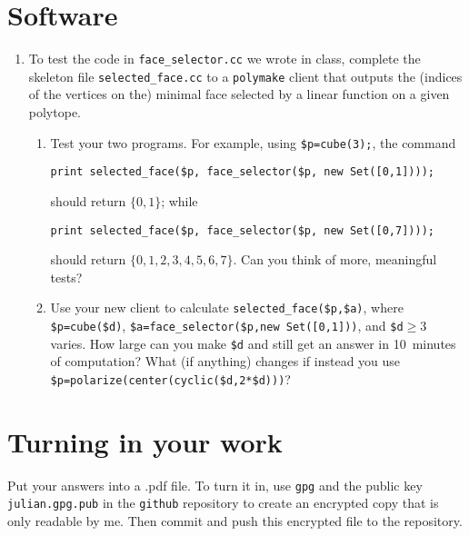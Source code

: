 \documentclass[11pt]{amsart}
\begin{document}
 \bigskip
 \section*{Software}

 \begin{enumerate}
   \setlength{\itemsep}{2ex}
 \item To test the code in \texttt{face\_selector.cc} we wrote in class, complete the skeleton file \texttt{selected\_face.cc} to a \texttt{polymake} client that outputs the (indices of the vertices on the) minimal face selected by a linear function on a given polytope. 
\begin{enumerate}
\item Test your two programs. For example, using \verb|$p=cube(3);|,
  the command 
\begin{verbatim}
print selected_face($p, face_selector($p, new Set([0,1])));
\end{verbatim}
should return $\{0,1\}$; while 
\begin{verbatim}
print selected_face($p, face_selector($p, new Set([0,7])));
\end{verbatim}
should return  $\{0,1,2,3,4,5,6,7\}$. Can you think of more, meaningful tests?

\item Use your new client to calculate \verb|selected_face($p,$a)|, where \verb|$p=cube($d)|, \verb|$a=face_selector($p,new Set([0,1]))|, and \verb|$d|${}\ge3$ varies. How large can you make \verb|$d| and still get an answer in 10~minutes of computation? What (if anything) changes if instead you use \verb|$p=polarize(center(cyclic($d,2*$d)))|? 
\end{enumerate}
 \end{enumerate}


\bigskip
\section*{Turning in your work}

Put your answers into a .pdf file. To turn it in, use \texttt{gpg} and the public key \texttt{julian.gpg.pub} in the \texttt{github} repository to create an encrypted copy that is only readable by me. Then commit and push this encrypted file to the repository.
\end{document}
